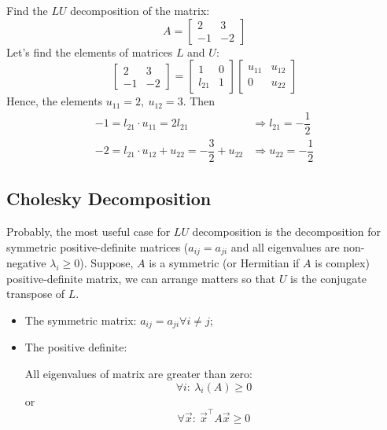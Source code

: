 \Ex Find the $LU$ decomposition of the matrix:
\[
    A = \begin{bmatrix}
        2 & 3\\
        -1 & -2
    \end{bmatrix}    
\]
Let's find the elements of matrices $L$ and $U$:
\[
    \begin{bmatrix}
        2 & 3\\
        -1 & -2
    \end{bmatrix} = \begin{bmatrix}
        1 & 0\\
        l_{21} & 1
    \end{bmatrix}  \begin{bmatrix}
        u_{11} & u_{12}\\
        0 & u_{22}
    \end{bmatrix} 
\]
Hence, the elements $u_{11} = 2, \ u_{12} = 3$. Then
\[
    \begin{array}{lr}
        -1 = l_{21} \cdot u_{11} = 2l_{21} & \Longrightarrow l_{21} = -\dfrac{1}{2} \\[0.5cm]
        -2 = l_{21} \cdot u_{12} + u_{22} = -\dfrac{3}{2} + u_{22} & \Longrightarrow u_{22} = -\dfrac{1}{2}
        
    \end{array}
\]
\newpage
\subsection*{Cholesky Decomposition}
Probably, the most useful case for $LU$ decomposition is the decomposition for symmetric positive-definite matrices ($a_{ij} = a_{ji}$ and all eigenvalues are non-negative $\lambda_i \geq 0$). Suppose, $A$ is a symmetric (or Hermitian if $A$ is complex) positive-definite matrix, we can arrange matters so that $U$ is the conjugate transpose of $L$.

\begin{note}{}{}
    \begin{itemize}
        \item The symmetric matrix: $a_{ij} = a_{ji} \forall i\neq j$;
        \item The positive definite:
        \par 
        All eigenvalues of matrix are greater than zero:
        \[
            \forall i: \ \lambda_i(A) \geq 0    
        \]
        or
        \[
            \forall \vec{x}:\ \vec{x}^\intercal A \vec{x} \geq 0  
        \]
    \end{itemize}
\end{note}

